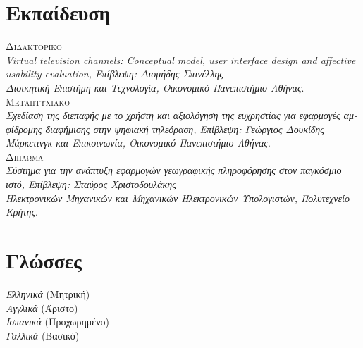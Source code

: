 \documentclass[11pt, a4paper]{article}
\newcommand{\note}[1]{\marginnote{\scriptsize #1}}
\begin{document}
\begin{greek}
\section{Εκπαίδευση}
\noindent
\note{2004}\textsc{Διδακτορικό}\\
\emph{Virtual television channels: Conceptual model, user interface
design and affective usability evaluation, Επίβλεψη: Διομήδης
Σπινέλλης}\\
\emph{Διοικητική Επιστήμη και Τεχνολογία, Οικονομικό Πανεπιστήμιο
Αθήνας}.\\[.2cm]
\note{2001}\textsc{Μεταπτυχιακό}\\
\emph{Σχεδίαση της διεπαφής με το χρήστη και αξιολόγηση της ευχρηστίας
για εφαρμογές αμφίδρομης διαφήμισης στην ψηφιακή τηλεόραση, Επίβλεψη:
Γεώργιος Δουκίδης}\\
\emph{Μάρκετινγκ και Επικοινωνία, Οικονομικό Πανεπιστήμιο
Αθήνας}.\\[.2cm]
\note{1999}\textsc{Δίπλωμα}\\
\emph{Σύστημα για την ανάπτυξη εφαρμογών γεωγραφικής πληροφόρησης στον
παγκόσμιο ιστό, Επίβλεψη: Σταύρος Χριστοδουλάκης}\\
\emph{Ηλεκτρονικών Μηχανικών και Μηχανικών Ηλεκτρονικών
Υπολογιστών, Πολυτεχνείο Κρήτης}.\\[.2cm]

\section{Γλώσσες}
\emph{Ελληνικά} (Μητρική)\\
\emph{Αγγλικά} (Άριστο)\\
\emph{Ισπανικά} (Προχωρημένο)\\
\emph{Γαλλικά} (Βασικό)\\


\end{greek}
\end{document}
